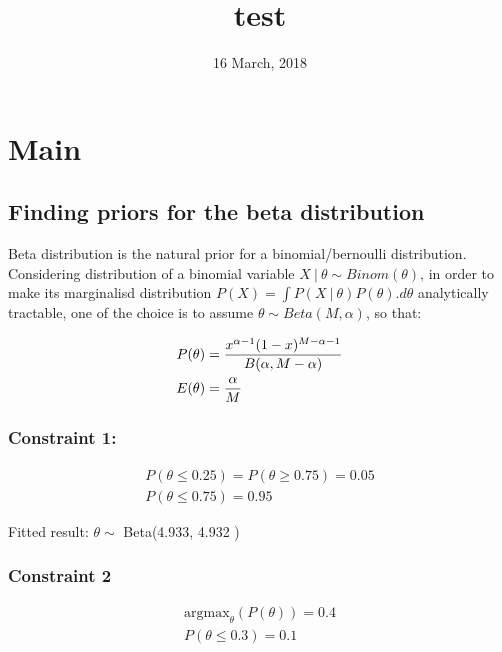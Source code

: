 \documentclass[]{article}
\title{test}
\author{}
\date{16 March, 2018}
\newcommand\gvn[1][]{\:#1\vert\:}
\theoremstyle{definition}
\theoremstyle{definition}
\theoremstyle{definition}
\theoremstyle{remark}
\begin{document}
\maketitle

{
\setcounter{tocdepth}{4}
\tableofcontents
}
\section{Main}\label{main}

\subsection{Finding priors for the beta
distribution}\label{finding-priors-for-the-beta-distribution}

Beta distribution is the natural prior for a binomial/bernoulli
distribution. Considering distribution of a binomial variable
\(X\gvn\theta\sim Binom(\theta)\), in order to make its marginalisd
distribution \(P(X) = \int P(X\gvn\theta)P(\theta).d\theta\)
analytically tractable, one of the choice is to assume
\(\theta\sim Beta(M,\alpha)\), so that:

\[
\begin{aligned}
P(\theta) &=\frac{x^{\alpha - 1}(1-x)^{M-\alpha-1}}{B(\alpha,M-\alpha)}
\\
E(\theta) &={\alpha\over M }
\end{aligned}
\]

\subsubsection{Constraint 1:}\label{constraint-1}

\[
\begin{aligned}
P(\theta\le 0.25) = P(\theta\ge 0.75) =  0.05 \\
P(\theta\le 0.75)=0.95
\end{aligned}
\]

Fitted result: \(\theta\sim\) Beta(4.933, 4.932 )

\subsubsection{Constraint 2}\label{constraint-2}

\[
\begin{aligned}
\text{argmax}_\theta(P(\theta))=0.4 \\
P(\theta\le 0.3) = 0.1
\end{aligned}
\]
\end{document}
